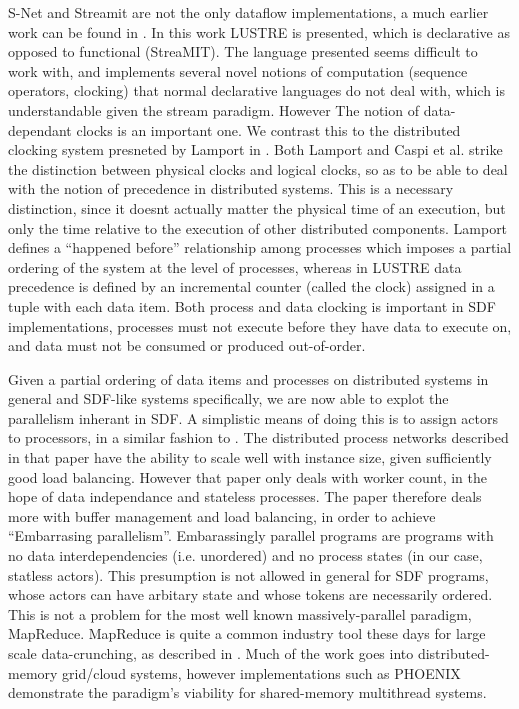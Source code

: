 S-Net and Streamit are not the only dataflow implementations, a much earlier work can be found in \cite{cas87}.
In this work LUSTRE is presented, which is declarative as opposed to functional (StreaMIT).
The language presented seems difficult to work with, and implements several novel notions of computation (sequence operators, clocking) that normal declarative languages do not deal with, which is understandable given the stream paradigm.
However The notion of data-dependant clocks is an important one.
We contrast this to the distributed clocking system presneted by Lamport in \cite{lam78}.
Both Lamport and Caspi et al. strike the distinction between physical clocks and logical clocks, so as to be able to deal with the notion of precedence in distributed systems.
This is a necessary distinction, since it doesnt actually matter the physical time of an execution, but only the time relative to the execution of other distributed components.
Lamport defines a ``happened before'' relationship among processes which imposes a partial ordering of the system at the level of processes, whereas in LUSTRE data precedence is defined by an incremental counter (called the clock) assigned in a tuple with each data item.
Both process and data clocking is important in SDF implementations, processes must not execute before they have data to execute on, and data must not be consumed or produced out-of-order.

Given a partial ordering of data items and processes on distributed systems in general and SDF-like systems specifically, we are now able to explot the parallelism inherant in SDF.
A simplistic means of doing this is to assign actors to processors, in a similar fashion to \cite{par03}.
The distributed process networks described in that paper have the ability to scale well with instance size, given sufficiently good load balancing.
However that paper only deals with worker count, in the hope of data independance and stateless processes.
The paper therefore deals more with buffer management and load balancing, in order to achieve ``Embarrasing parallelism''.
Embarassingly parallel programs are programs with no data interdependencies (i.e. unordered) and no process states (in our case, statless actors).
This presumption is not allowed in general for SDF programs, whose actors can have arbitary state and whose tokens are necessarily ordered.
This is not a problem for the most well known massively-parallel paradigm, MapReduce.
MapReduce is quite a common industry tool these days for large scale data-crunching, as described in \cite{dea08}.
Much of the work goes into distributed-memory grid/cloud systems, however implementations such as PHOENIX \cite{ran07} demonstrate the paradigm's viability for shared-memory multithread systems.


